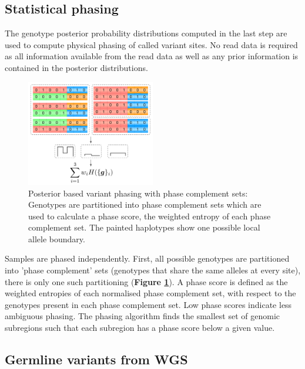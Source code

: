 \documentclass[notitlepage, twocolumn]{article}
\begin{document}
\subsection*{Statistical phasing}

The genotype posterior probability distributions computed in the last step are used to compute physical phasing of called variant sites. No read data is required as all information available from the read data as well as any prior information is contained in the posterior distributions.

\begin{figure}[ht]
\centering
\includegraphics[width=0.5\textwidth]{figures/phasing}
\caption{Posterior based variant phasing with phase complement sets: Genotypes are partitioned into phase complement sets which are used to calculate a phase score, the weighted entropy of each phase complement set. The painted haplotypes show one possible local allele boundary.}
\label{fig:phasing}
\vspace{-1.5em}
\end{figure}

Samples are phased independently. First, all possible genotypes are partitioned into  'phase complement' sets (genotypes that share the same alleles at every site), there is only one such partitioning (\textbf{Figure \ref{fig:phasing}}). A phase score is defined as the weighted entropies of each normalised phase complement set, with respect to the genotypes present in each phase complement set. Low phase scores indicate less ambiguous phasing. The phasing algorithm finds the smallest set of genomic subregions such that each subregion has a phase score below a given value. 

\subsection*{Germline variants from WGS}
\end{document}
